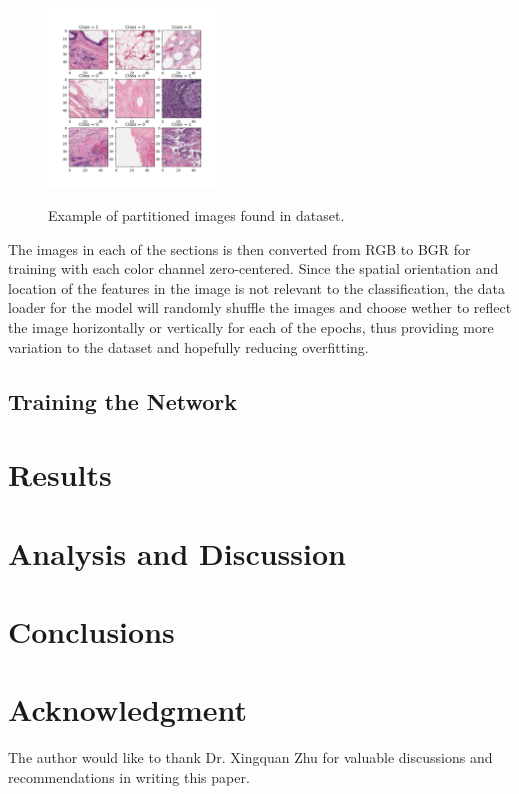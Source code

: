 \documentclass[conference]{IEEEtran}
\begin{document}
\begin{figure}
\centering
\includegraphics[width=0.4\textwidth]{figures/dataset_example.png}
\label{dataset_example}
\caption{Example of partitioned images found in dataset.}
\end{figure}


The images in each of the sections is then converted from RGB to BGR for training with each color channel zero-centered. Since the spatial orientation and location of the features in the image is not relevant to the classification, the data loader for the model will randomly shuffle the images and choose wether to reflect the image horizontally or vertically for each of the epochs, thus providing more variation to the dataset and hopefully reducing overfitting.

\subsection{Training the Network}

\section{Results}

\section{Analysis and Discussion}

\section{Conclusions}

\section*{Acknowledgment}
The author would like to thank Dr. Xingquan Zhu for valuable discussions and recommendations in writing this paper.


\end{document}
